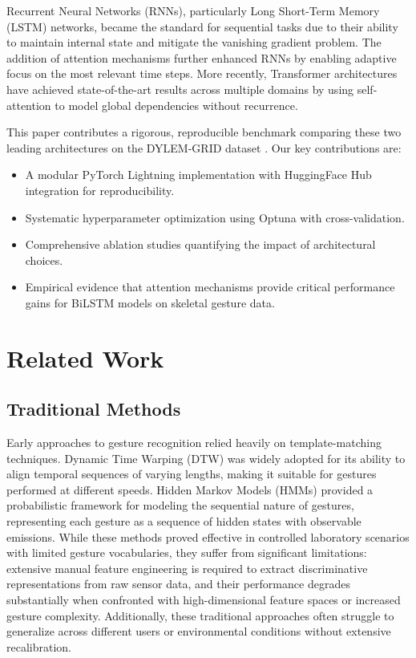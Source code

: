 \documentclass[conference]{IEEEtran}
\begin{document}
Recurrent Neural Networks (RNNs), particularly Long Short-Term Memory (LSTM) \cite{hochreiter1997} networks, became the standard for sequential tasks due to their ability to maintain internal state and mitigate the vanishing gradient problem. The addition of attention mechanisms \cite{bahdanau2014} further enhanced RNNs by enabling adaptive focus on the most relevant time steps. More recently, Transformer architectures \cite{vaswani2017} have achieved state-of-the-art results across multiple domains by using self-attention to model global dependencies without recurrence.

This paper contributes a rigorous, reproducible benchmark comparing these two leading architectures on the DYLEM-GRID dataset \cite{dylem2024}. Our key contributions are:

\begin{itemize}
    \item A modular PyTorch Lightning implementation with HuggingFace Hub integration for reproducibility.
    \item Systematic hyperparameter optimization using Optuna with cross-validation.
    \item Comprehensive ablation studies quantifying the impact of architectural choices.
    \item Empirical evidence that attention mechanisms provide critical performance gains for BiLSTM models on skeletal gesture data.
\end{itemize}

\section{Related Work}

\subsection{Traditional Methods}
Early approaches to gesture recognition relied heavily on template-matching techniques. Dynamic Time Warping (DTW) was widely adopted for its ability to align temporal sequences of varying lengths, making it suitable for gestures performed at different speeds. Hidden Markov Models (HMMs) \cite{rabiner1989} provided a probabilistic framework for modeling the sequential nature of gestures, representing each gesture as a sequence of hidden states with observable emissions. While these methods proved effective in controlled laboratory scenarios with limited gesture vocabularies, they suffer from significant limitations: extensive manual feature engineering is required to extract discriminative representations from raw sensor data, and their performance degrades substantially when confronted with high-dimensional feature spaces or increased gesture complexity. Additionally, these traditional approaches often struggle to generalize across different users or environmental conditions without extensive recalibration.
\end{document}
